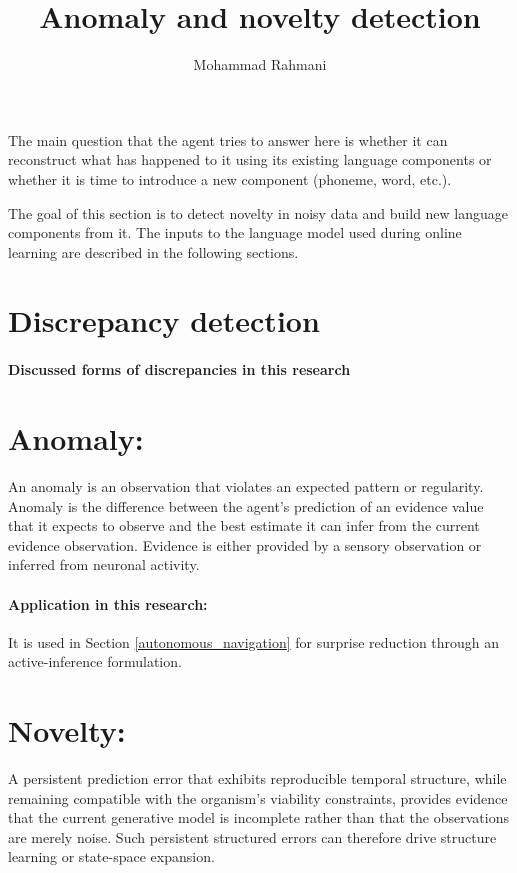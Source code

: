 \documentclass[a4paper]{article}
\title{Anomaly and novelty detection}
\date{}
\author{Mohammad Rahmani}
\begin{document}
   \maketitle
   \label{anomaly_and_novelty_detection}






   \section{}
      The main question that the agent tries to answer here is whether it can reconstruct what has happened to it using its existing language components or whether it is time to introduce a new component (phoneme, word, etc.).

      The goal of this section is to detect novelty in noisy data and build new language components from it. The inputs to the language model used during online learning are described in the following sections.




   \section{Discrepancy detection}
            \paragraph{Discussed forms of discrepancies in this research}
   \section{Anomaly:} An anomaly is an observation that violates an expected pattern or regularity. Anomaly is the difference between the agent's prediction of an evidence value that it expects to observe and the best estimate it can infer from the current evidence observation. Evidence is either provided by a sensory observation or inferred from neuronal activity.

            \paragraph{Application in this research:} It is used in Section \ref{autonomous_navigation} for surprise reduction through an active-inference formulation.

   \section{Novelty:}
      A persistent prediction error that exhibits reproducible temporal structure, while remaining compatible with the organism's viability constraints, provides evidence that the current generative model is incomplete rather than that the observations are merely noise. Such persistent structured errors can therefore drive structure learning or state-space expansion.
\end{document}
